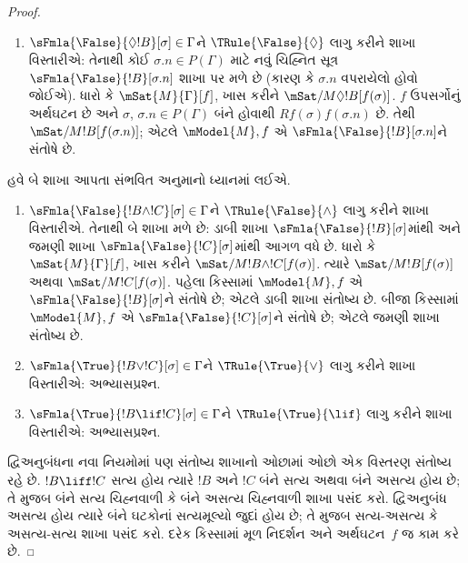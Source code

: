 \begin{proof}
\begin{enumerate}
  $\mSat{M}{\Diamond !B}[f(\sigma)]$ હોવાથી એવું $w \in W$
  છે કે $Rf(\sigma)w$ અને $\mSat{M}{!B}[w]$. $f'$ એ $f$
  જેવું જ રાખો, માત્ર $f'(\sigma.n) = w$.
  $f'(\sigma) = f(\sigma)$ અને $Rf(\sigma)w$ હોવાથી
  $Rf'(\sigma)f'(\sigma.n)$; તેથી $f'$ એ
  $P(\Gamma) \cup \{\sigma.n\}$નું અર્થઘટન છે. સ્પષ્ટ છે કે
  $\mSat{M}{!B}[f'(\sigma.n)]$. બધા ઉપસર્ગ
  $\sigma' \in P(\Gamma)$ માટે $f(\sigma') = f'(\sigma')$
  હોવાથી $\mSat{M}{\Gamma}[f']$. આમ $\mModel{M}, f'$ એ
  $\Gamma \cup \{\sFmla{\True}{!B}[\sigma.n]\}$ને સંતોષે છે.
\item $\sFmla{\False}{\Diamond !B}[\sigma] \in \Gamma$ને
  $\TRule{\False}{\Diamond}$ લાગુ કરીને શાખા વિસ્તારીએ:
  તેનાથી કોઈ
    $\sigma.n \in P(\Gamma)$ માટે નવું ચિહ્નિત સૂત્ર~$\sFmla{\False}{!B}[\sigma.n]$ શાખા પર મળે છે
    (કારણ કે $\sigma.n$ વપરાયેલો હોવો જોઈએ). ધારો કે
    $\mSat{M}{\Gamma}[f]$, ખાસ કરીને
    $\mSat/{M}{\Diamond !B}[f(\sigma)]$. $f$ ઉપસર્ગોનું
    અર્થઘટન છે અને $\sigma$, $\sigma.n \in P(\Gamma)$ બંને
    હોવાથી $Rf(\sigma)f(\sigma.n)$ છે. તેથી
    $\mSat/{M}{!B}[f(\sigma.n)]$; એટલે $\mModel{M}, f$ એ
    $\sFmla{\False}{!B}[\sigma.n]$ને સંતોષે છે.
  
\end{enumerate}
હવે બે શાખા આપતા સંભવિત અનુમાનો ધ્યાનમાં લઈએ.
\begin{enumerate}
\item $\sFmla{\False}{!B \land !C}[\sigma] \in \Gamma$ને
  $\TRule{\False}{\land}$ લાગુ કરીને શાખા વિસ્તારીએ. તેનાથી
  બે શાખા મળે છે: ડાબી શાખા $\sFmla{\False}{!B}[\sigma]$માંથી
  અને જમણી શાખા $\sFmla{\False}{!C}[\sigma]$માંથી આગળ વધે છે.
  ધારો કે $\mSat{M}{\Gamma}[f]$, ખાસ કરીને
  $\mSat/{M}{!B \land !C}[f(\sigma)]$. ત્યારે
  $\mSat/{M}{!B}[f(\sigma)]$ અથવા
  $\mSat/{M}{!C}[f(\sigma)]$. પહેલા કિસ્સામાં
  $\mModel{M}, f$ એ $\sFmla{\False}{!B}[\sigma]$ને સંતોષે છે;
  એટલે ડાબી શાખા સંતોષ્ય છે. બીજા કિસ્સામાં
  $\mModel{M}, f$ એ $\sFmla{\False}{!C}[\sigma]$ને સંતોષે છે;
  એટલે જમણી શાખા સંતોષ્ય છે.
\item $\sFmla{\True}{!B \lor !C}[\sigma] \in \Gamma$ને
    $\TRule{\True}{\lor}$ લાગુ કરીને શાખા વિસ્તારીએ:
    અભ્યાસપ્રશ્ન.
\item $\sFmla{\True}{!B \lif !C}[\sigma] \in \Gamma$ને
    $\TRule{\True}{\lif}$ લાગુ કરીને શાખા વિસ્તારીએ:
    અભ્યાસપ્રશ્ન.
\end{enumerate}
દ્વિઅનુબંધના નવા નિયમોમાં પણ સંતોષ્ય શાખાનો ઓછામાં ઓછો
એક વિસ્તરણ સંતોષ્ય રહે છે. $!B \liff !C$ સત્ય હોય ત્યારે
$!B$ અને $!C$ બંને સત્ય અથવા બંને અસત્ય હોય છે; તે મુજબ
બંને સત્ય ચિહ્નવાળી કે બંને અસત્ય ચિહ્નવાળી શાખા પસંદ કરો.
દ્વિઅનુબંધ અસત્ય હોય ત્યારે બંને ઘટકોનાં સત્યમૂલ્યો જુદાં
હોય છે; તે મુજબ સત્ય-અસત્ય કે અસત્ય-સત્ય શાખા પસંદ કરો.
દરેક કિસ્સામાં મૂળ નિદર્શન અને અર્થઘટન~$f$ જ કામ કરે છે.
\end{proof}

